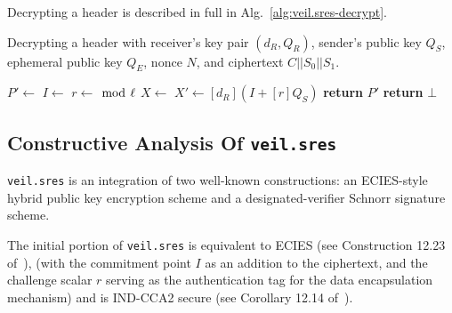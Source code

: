 Decrypting a header is described in full in Alg.~\ref{alg:veil.sres-decrypt}.

\begin{algorithm}[!htp]
    \caption{
        Decrypting a header with receiver's key pair $(d_R, Q_R)$, sender's public key $Q_S$, ephemeral public key
        $Q_E$, nonce $N$, and ciphertext $C||S_0||S_1$.
    }
    \begin{algorithmic}[1]
            \State {} 
            \State {}\label{alg:veil.sres-decrypt-bind-sender}
            \State {}
            \State {}
            \State {}
            \State
            \State {}
            \State $P' \gets$ 
            \State
            \State $I \gets$ 
            \State $r \gets$  $\bmod~\ell$
            \State
            \State $X \gets$ 
            \State $X' \gets [d_R](I + [r]Q_S)$
            \State
                \State \textbf{return} $P'$
            \Else
                \State \textbf{return} $\bot$
            \EndIf
        \EndFunction
    \end{algorithmic}
    \label{alg:veil.sres-decrypt}
\end{algorithm}

\subsection{Constructive Analysis Of \texttt{veil.sres}}\label{subsec:veil.sres-analysis}

\texttt{veil.sres} is an integration of two well-known constructions: an ECIES-style hybrid public key encryption scheme
and a designated-verifier Schnorr signature scheme.

The initial portion of \texttt{veil.sres} is equivalent to ECIES (see Construction 12.23 of~\cite[p. 435]{katz2020}),
(with the commitment point $I$ as an addition to the ciphertext, and the challenge scalar $r$ serving as the
authentication tag for the data encapsulation mechanism) and is IND-CCA2 secure (see Corollary 12.14
of~\cite[p. 436]{katz2020}).

